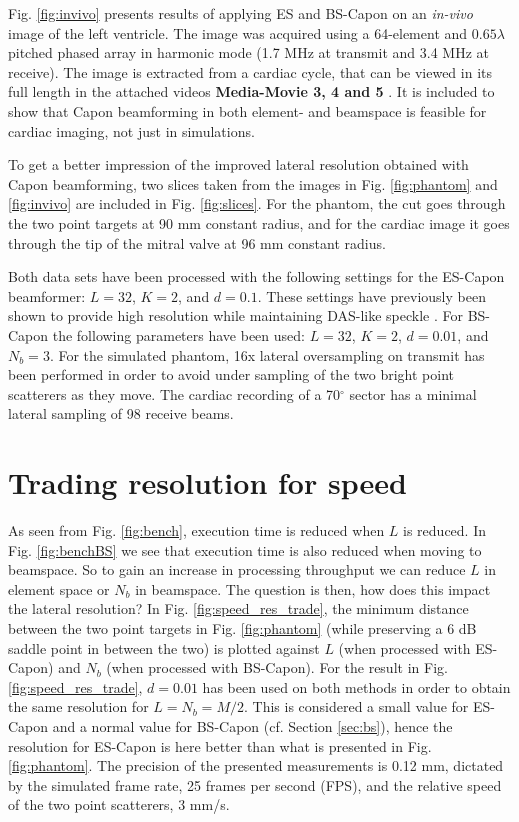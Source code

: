 \documentclass[journal]{IEEEtran}
\newcommand{\degree}{\ensuremath{^\circ}}
\newcommand\multimedia[1]{\textbf{{\color{red}#1}}}
\begin{document}
Fig. \ref{fig:invivo} presents results of applying ES and BS-Capon on an \textit{in-vivo} image of the left ventricle. The image was acquired using a 64-element and $0.65\lambda$ pitched phased array in harmonic mode (1.7 MHz at transmit and 3.4 MHz at receive). The image is extracted from a cardiac cycle, that can be viewed in its full length in the attached videos \multimedia{Media-Movie 3, 4 and 5} . It is included to show that Capon beamforming in both element- and beamspace is feasible for cardiac imaging, not just in simulations.

To get a better impression of the improved lateral resolution obtained with Capon beamforming, two slices taken from the images in Fig. \ref{fig:phantom} and \ref{fig:invivo} are included in Fig. \ref{fig:slices}. For the phantom, the cut goes through the two point targets at 90 mm constant radius, and for the cardiac image it goes through the tip of the mitral valve at 96 mm constant radius.

Both data sets have been processed with the following settings for the ES-Capon beamformer: $L = 32$, $K = 2$, and $d=0.1$. These settings have previously been shown to provide high resolution while maintaining DAS-like speckle \cite{Synnevag2007a}. For BS-Capon the following parameters have been used: $L=32$, $K=2$, $d=0.01$, and $N_b=3$. For the simulated phantom, 16x lateral oversampling on transmit has been performed in order to avoid under sampling of the two bright point scatterers as they move. The cardiac recording of a 70\degree{} sector has a minimal lateral sampling of 98 receive beams.

\section{Trading resolution for speed}\label{sec:trade}
As seen from Fig. \ref{fig:bench}, execution time is reduced when $L$ is reduced. In Fig. \ref{fig:benchBS} we see that execution time is also reduced when moving to beamspace. So to gain an  increase in processing throughput we can reduce $L$ in element space or $N_b$ in beamspace. The question is then, how does this impact the lateral resolution? In Fig. \ref{fig:speed_res_trade}, the minimum distance between the two point targets in Fig. \ref{fig:phantom} (while preserving a 6 dB saddle point in between the two) is plotted against $L$ (when processed with ES-Capon) and $N_b$ (when processed with BS-Capon). For the result in Fig. \ref{fig:speed_res_trade}, $d=0.01$ has been used on both methods in order to obtain the same resolution for $L=N_b=M/2$. This is considered a small value for ES-Capon and a normal value for BS-Capon (cf. Section \ref{sec:bs}), hence the resolution for ES-Capon is here better than what is presented in Fig. \ref{fig:phantom}. The precision of the presented measurements is 0.12 mm, dictated by the simulated frame rate, 25 frames per second (FPS), and the relative speed of the two point scatterers, 3 mm/s.
\end{document}
